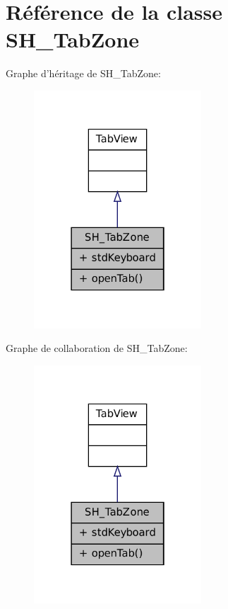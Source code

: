 \hypertarget{classSH__TabZone}{\section{Référence de la classe S\-H\-\_\-\-Tab\-Zone}
\label{classSH__TabZone}
}


Graphe d'héritage de S\-H\-\_\-\-Tab\-Zone\-:
\nopagebreak
\begin{figure}[H]
\begin{center}
\leavevmode
\includegraphics[width=178pt]{classSH__TabZone__inherit__graph}
\end{center}
\end{figure}


Graphe de collaboration de S\-H\-\_\-\-Tab\-Zone\-:
\nopagebreak
\begin{figure}[H]
\begin{center}
\leavevmode
\includegraphics[width=178pt]{classSH__TabZone__coll__graph}
\end{center}
\end{figure}
